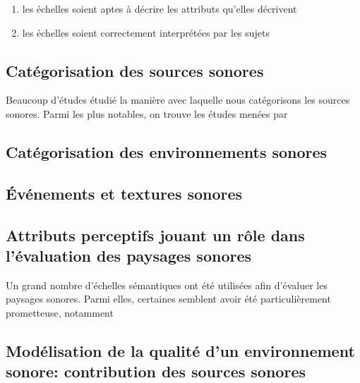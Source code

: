 \begin{enumerate}
\item  les échelles soient aptes à décrire les attributs qu'elles décrivent
\item les échelles soient correctement interprétées par les sujets
\end{enumerate}

\subsection{Catégorisation des sources sonores}

Beaucoup d'études étudié la manière avec laquelle nous catégorisons les sources sonores. Parmi les plus notables, on trouve les études menées par 
\subsection{Catégorisation des environnements sonores}

\subsection{Événements et textures sonores}

\subsection{Attributs perceptifs jouant un rôle dans l'évaluation des paysages sonores}

Un grand nombre d'échelles sémantiques ont été utilisées afin d'évaluer les paysages sonores. Parmi elles, certaines semblent avoir été particulièrement prometteuse, notamment 

\subsection{Modélisation de la qualité d'un environnement sonore: contribution des sources sonores}



